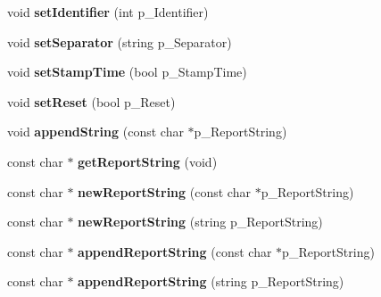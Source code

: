 \begin{DoxyCompactItemize}
\item 
\hypertarget{classStringTools_a673dcdaa425b6e08d24dadebbbb819a6}{void {\bfseries set\-Identifier} (int p\-\_\-\-Identifier)}\label{classStringTools_a673dcdaa425b6e08d24dadebbbb819a6}

\item 
\hypertarget{classStringTools_a7c53fe0bee5863c8a60fd00de8ee31cd}{void {\bfseries set\-Separator} (string p\-\_\-\-Separator)}\label{classStringTools_a7c53fe0bee5863c8a60fd00de8ee31cd}

\item 
\hypertarget{classStringTools_a5ad25d9ce230ceb78f9de0fd265c0eda}{void {\bfseries set\-Stamp\-Time} (bool p\-\_\-\-Stamp\-Time)}\label{classStringTools_a5ad25d9ce230ceb78f9de0fd265c0eda}

\item 
\hypertarget{classStringTools_a9c6cfac09aa84ede205615484adc6fef}{void {\bfseries set\-Reset} (bool p\-\_\-\-Reset)}\label{classStringTools_a9c6cfac09aa84ede205615484adc6fef}

\item 
\hypertarget{classStringTools_a47594cf2ed9755da81c1ac31afb531ed}{void {\bfseries append\-String} (const char $\ast$p\-\_\-\-Report\-String)}\label{classStringTools_a47594cf2ed9755da81c1ac31afb531ed}

\item 
\hypertarget{classStringTools_a726e754e512e5515678de7a9f72f7968}{const char $\ast$ {\bfseries get\-Report\-String} (void)}\label{classStringTools_a726e754e512e5515678de7a9f72f7968}

\item 
\hypertarget{classStringTools_a87cc25f9580e48c998495995280ebe7b}{const char $\ast$ {\bfseries new\-Report\-String} (const char $\ast$p\-\_\-\-Report\-String)}\label{classStringTools_a87cc25f9580e48c998495995280ebe7b}

\item 
\hypertarget{classStringTools_a57cb7b0268c5ef8fa1f3ab64f3fab974}{const char $\ast$ {\bfseries new\-Report\-String} (string p\-\_\-\-Report\-String)}\label{classStringTools_a57cb7b0268c5ef8fa1f3ab64f3fab974}

\item 
\hypertarget{classStringTools_a637a5d56f642802d896b9e57d081889d}{const char $\ast$ {\bfseries append\-Report\-String} (const char $\ast$p\-\_\-\-Report\-String)}\label{classStringTools_a637a5d56f642802d896b9e57d081889d}

\item 
\hypertarget{classStringTools_a452c24f683db8caa4837bc8190b7208d}{const char $\ast$ {\bfseries append\-Report\-String} (string p\-\_\-\-Report\-String)}\label{classStringTools_a452c24f683db8caa4837bc8190b7208d}


\end{DoxyCompactItemize}
